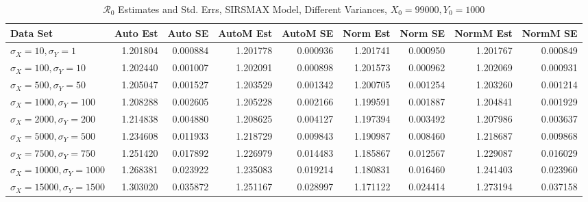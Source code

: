 \documentclass[12pt]{article}
\newcommand{\rr}{\ensuremath{\mathcal{R}_0}}
\begin{document}
\begin{table}[H]
	
	\caption{$\rr$ Estimates and Std. Errs, SIRSMAX Model,
		Different Variances, 
		$X_0 = 99000, Y_0 = 1000$}
	\begin{footnotesize}
		\hskip -1.7cm
		\begin{tabular}{l|r|r|r|r|r|r|r|r}
			\hline
			Data Set & Auto Est & Auto SE & AutoM Est & AutoM SE & Norm Est & Norm SE & NormM Est & NormM SE\\
			\hline
			$\sigma_X = 10, \sigma_Y = 1$ & 1.201804 & 0.000884 & 1.201778 & 0.000936 & 1.201741 & 0.000950 & 1.201767 & 0.000849\\
			\hline
			$\sigma_X = 100, \sigma_Y = 10$ & 1.202440 & 0.001007 & 1.202091 & 0.000898 & 1.201573 & 0.000962 & 1.202069 & 0.000931\\
			\hline
			$\sigma_X = 500, \sigma_Y = 50$ & 1.205047 & 0.001527 & 1.203529 & 0.001342 & 1.200705 & 0.001254 & 1.203260 & 0.001214\\
			\hline
			$\sigma_X = 1000, \sigma_Y = 100$ & 1.208288 & 0.002605 & 1.205228 & 0.002166 & 1.199591 & 0.001887 & 1.204841 & 0.001929\\
			\hline
			$\sigma_X = 2000, \sigma_Y = 200$ & 1.214838 & 0.004880 & 1.208625 & 0.004127 & 1.197394 & 0.003492 & 1.207986 & 0.003637\\
			\hline
			$\sigma_X = 5000, \sigma_Y = 500$ & 1.234608 & 0.011933 & 1.218729 & 0.009843 & 1.190987 & 0.008460 & 1.218687 & 0.009868\\
			\hline
			$\sigma_X = 7500, \sigma_Y = 750$ & 1.251420 & 0.017892 & 1.226979 & 0.014483 & 1.185867 & 0.012567 & 1.229087 & 0.016029\\
			\hline
			$\sigma_X = 10000, \sigma_Y = 1000$ & 1.268381 & 0.023922 & 1.235083 & 0.019214 & 1.180831 & 0.016460 & 1.241403 & 0.023960\\
			\hline
			$\sigma_X = 15000, \sigma_Y = 1500$ & 1.303020 & 0.035872 & 1.251167 & 0.028997 & 1.171122 & 0.024414 & 1.273194 & 0.037158\\
			\hline
		\end{tabular}
	\end{footnotesize}
\end{table}
\end{document}
